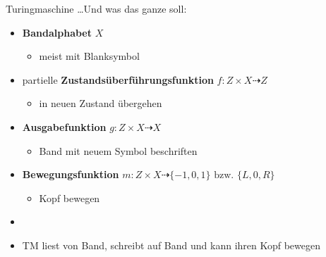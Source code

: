 \begin{frame}{Turingmaschine}
	\dots Und was das ganze soll:\\

	\begin{itemize}
		\item \textbf{Bandalphabet} $X$
		\begin{itemize}
			\item meist mit Blanksymbol \blank
		\end{itemize}
		\item partielle \textbf{Zustandsüberführungsfunktion} $f:Z\times X \dashrightarrow Z$
		\begin{itemize}
			\item in neuen Zustand übergehen
		\end{itemize}
		\item \textbf{Ausgabefunktion} $g:Z\times X \dashrightarrow X$
		\begin{itemize}
			\item Band mit neuem Symbol beschriften
		\end{itemize}
		\item \textbf{Bewegungsfunktion} $m:Z\times X \dashrightarrow \{ -1, 0, 1\} \text{ bzw. } \{ L,0,R\}$
		\begin{itemize}
			\item Kopf bewegen
		\end{itemize}
		\item[]
		\item TM liest von Band, schreibt auf Band und kann ihren Kopf bewegen
	\end{itemize}
\end{frame}

